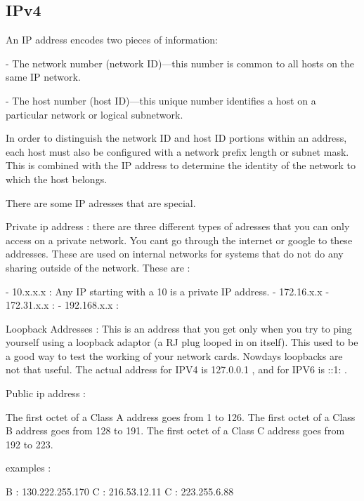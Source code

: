 \subsectionend

\subsection{IPv4}
\label{ssec:ipv4}

An IP address encodes two pieces of information:

- The network number (network ID)—this number is common to all hosts on the same IP network.

- The host number (host ID)—this unique number identifies a host on a particular network or logical subnetwork. 

In order to distinguish the network ID and host ID portions within an address, each host must also be configured with a network prefix length or subnet mask. This is combined with the IP address to determine the identity of the network to which the host belongs.

There are some IP adresses that are special.

Private ip address : there are three different types of adresses that you can
only access on a private network. You cant go through the internet or google to
these addresses. These are used on internal networks for systems that do not do
any sharing outside of the network. These are :

 - 10.x.x.x : Any IP starting with a 10 is a private IP address.
 - 172.16.x.x - 172.31.x.x :
 - 192.168.x.x :

Loopback Addresses : This is an address that you get only when you try to ping
yourself using a loopback adaptor (a RJ plug looped in on itself). This used to
be a good way to test the working of your network cards.  Nowdays loopbacks are
not that useful. The actual address for IPV4 is 127.0.0.1 , and for IPV6 is ::1:
.


Public ip address :









The first octet of a Class A address goes from 1 to 126. The first octet of a
Class B address goes from 128 to 191. The first octet of a Class C address goes
from 192 to 223.

examples :

B : 130.222.255.170 
C : 216.53.12.11
C : 223.255.6.88

